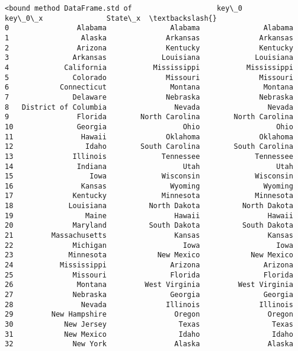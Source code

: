 \documentclass[11pt]{article}
\begin{document}
    \begin{Verbatim}[commandchars=\\\{\}]
<bound method DataFrame.std of                    key\_0               key\_0\_x               State\_x  \textbackslash{}
0                Alabama               Alabama               Alabama   
1                 Alaska              Arkansas              Arkansas   
2                Arizona              Kentucky              Kentucky   
3               Arkansas             Louisiana             Louisiana   
4             California           Mississippi           Mississippi   
5               Colorado              Missouri              Missouri   
6            Connecticut               Montana               Montana   
7               Delaware              Nebraska              Nebraska   
8   District of Columbia                Nevada                Nevada   
9                Florida        North Carolina        North Carolina   
10               Georgia                  Ohio                  Ohio   
11                Hawaii              Oklahoma              Oklahoma   
12                 Idaho        South Carolina        South Carolina   
13              Illinois             Tennessee             Tennessee   
14               Indiana                  Utah                  Utah   
15                  Iowa             Wisconsin             Wisconsin   
16                Kansas               Wyoming               Wyoming   
17              Kentucky             Minnesota             Minnesota   
18             Louisiana          North Dakota          North Dakota   
19                 Maine                Hawaii                Hawaii   
20              Maryland          South Dakota          South Dakota   
21         Massachusetts                Kansas                Kansas   
22              Michigan                  Iowa                  Iowa   
23             Minnesota            New Mexico            New Mexico   
24           Mississippi               Arizona               Arizona   
25              Missouri               Florida               Florida   
26               Montana         West Virginia         West Virginia   
27              Nebraska               Georgia               Georgia   
28                Nevada              Illinois              Illinois   
29         New Hampshire                Oregon                Oregon   
30            New Jersey                 Texas                 Texas   
31            New Mexico                 Idaho                 Idaho   
32              New York                Alaska                Alaska   

\end{Verbatim}
\end{document}
